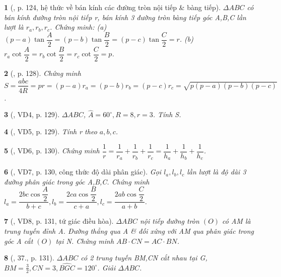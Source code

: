\documentclass{article}
\newtheorem{baitoan}{}
\begin{document}
\begin{baitoan}[\cite{TLCT_hinh_hoc_10}, p. 124, hệ thức về bán kính các đường tròn nội tiếp \& bàng tiếp]
	$\Delta ABC$ có bán kính đường tròn nội tiếp r, bán kính 3 đường tròn bàng tiếp góc A,B,C lần lượt là $r_a,r_b,r_c$. Chứng minh: (a) $(p - a)\tan\dfrac{A}{2} = (p - b)\tan\dfrac{B}{2} = (p - c)\tan\dfrac{C}{2} = r$. (b) $r_a\cot\dfrac{A}{2} = r_b\cot\dfrac{B}{2} = r_c\cot\dfrac{C}{2} = p$.
\end{baitoan}

\begin{baitoan}[\cite{TLCT_hinh_hoc_10}, p. 128]
	Chứng minh $S = \dfrac{abc}{4R} = pr = (p - a)r_a = (p - b)r_b = (p - c)r_c = \sqrt{p(p - a)(p - b)(p - c)}$.
\end{baitoan}

\begin{baitoan}[\cite{TLCT_hinh_hoc_10}, VD4, p. 129]
	$\Delta ABC$, $\widehat{A} = 60^\circ,R = 8,r = 3$. Tính S.
\end{baitoan}

\begin{baitoan}[\cite{TLCT_hinh_hoc_10}, VD5, p. 129]
	Tính r theo $a,b,c$.
\end{baitoan}

\begin{baitoan}[\cite{TLCT_hinh_hoc_10}, VD6, p. 130]
	Chứng minh $\dfrac{1}{r} = \dfrac{1}{r_a} + \dfrac{1}{r_b} + \dfrac{1}{r_c} = \dfrac{1}{h_a} + \dfrac{1}{h_b} + \dfrac{1}{h_c}$.
\end{baitoan}

\begin{baitoan}[\cite{TLCT_hinh_hoc_10}, VD7, p. 130, công thức độ dài phân giác]
	Gọi $l_a,l_b,l_c$ lần lượt là độ dài 3 đường phân giác trong góc A,B,C. Chứng minh $l_a = \dfrac{2bc\cos\dfrac{A}{2}}{b + c},l_b = \dfrac{2ca\cos\dfrac{B}{2}}{c + a},l_c = \dfrac{2ab\cos\dfrac{C}{2}}{a + b}$.
\end{baitoan}

\begin{baitoan}[\cite{TLCT_hinh_hoc_10}, VD8, p. 131, tứ giác điều hòa]
	$\Delta ABC$ nội tiếp đường tròn $(O)$ có AM là trung tuyến đỉnh A. Đường thẳng qua A \& đối xứng với AM qua phân giác trong góc A cắt $(O)$ tại N. Chứng minh $AB\cdot CN = AC\cdot BN$.
\end{baitoan}

\begin{baitoan}[\cite{TLCT_hinh_hoc_10}, 37., p. 131]
	$\Delta ABC$ có 2 trung tuyến BM,CN cắt nhau tại G, $BM = \frac{3}{2},CN = 3,\widehat{BGC} = 120^\circ$. Giải $\Delta ABC$.
\end{baitoan}
\end{document}
